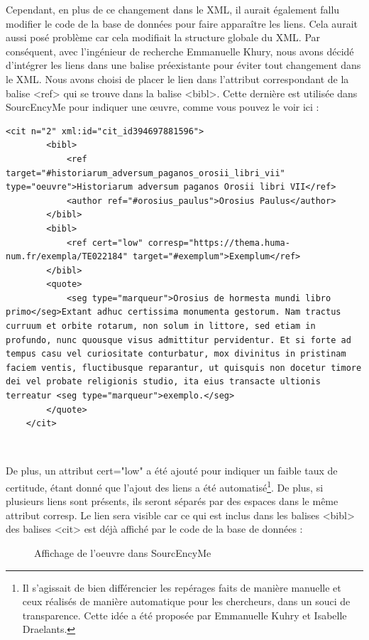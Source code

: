 Cependant, en plus de ce changement dans le XML, il aurait également fallu modifier le code de la base de données pour faire apparaître les liens. Cela aurait aussi posé problème car cela modifiait la structure globale du XML. Par conséquent, avec l’ingénieur de recherche Emmanuelle Khury, nous avons décidé d’intégrer les liens dans une balise préexistante pour éviter tout changement dans le XML. Nous avons choisi de placer le lien dans l’attribut correspondant de la balise <ref> qui se trouve dans la balise <bibl>. Cette dernière est utilisée dans SourcEncyMe pour indiquer une œuvre, comme vous pouvez le voir ici : \\

\begin{lstlisting}[breaklines=true]
	<cit n="2" xml:id="cit_id394697881596">
		<bibl>
			<ref target="#historiarum_adversum_paganos_orosii_libri_vii" type="oeuvre">Historiarum adversum paganos Orosii libri VII</ref>
			<author ref="#orosius_paulus">Orosius Paulus</author>
		</bibl>
		<bibl>
			<ref cert="low" corresp="https://thema.huma-num.fr/exempla/TE022184" target="#exemplum">Exemplum</ref>
		</bibl>
		<quote>
			<seg type="marqueur">Orosius de hormesta mundi libro primo</seg>Extant adhuc certissima monumenta gestorum. Nam tractus curruum et orbite rotarum, non solum in littore, sed etiam in profundo, nunc quousque visus admittitur pervidentur. Et si forte ad tempus casu vel curiositate conturbatur, mox divinitus in pristinam faciem ventis, fluctibusque reparantur, ut quisquis non docetur timore dei vel probate religionis studio, ita eius transacte ultionis terreatur <seg type="marqueur">exemplo.</seg>
		</quote>
	</cit>
\end{lstlisting}

\

De plus, un attribut cert="low" a été ajouté pour indiquer un faible taux de certitude, étant donné que l'ajout des liens a été automatisé\footnote{Il s'agissait de bien différencier les repérages faits de manière manuelle et ceux réalisés de manière automatique pour les chercheurs, dans un souci de transparence. Cette idée a été proposée par Emmanuelle Kuhry et Isabelle Draelants.}. De plus, si plusieurs liens sont présents, ils seront séparés par des espaces dans le même attribut corresp. Le lien sera visible car ce qui est inclus dans les balises <bibl> des balises <cit> est déjà affiché par le code de la base de données : \\

\begin{figure}[H]
	\centering
	\caption{Affichage de l'oeuvre dans SourcEncyMe}
\end{figure}

